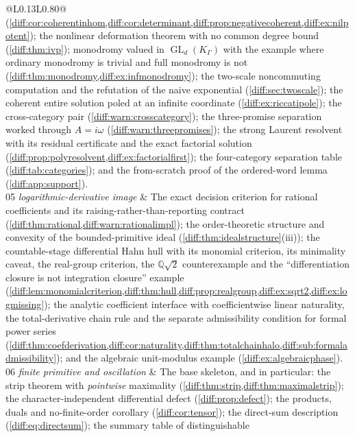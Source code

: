 \documentclass[11pt,letterpaper]{article}
\numberwithin{equation}{section}
\theoremstyle{definition}
\theoremstyle{remark}
\newcommand{\Q}{\mathbb Q}
\newcommand{\GL}{\operatorname{GL}}
\begin{document}
\begin{longtable}{@{}L{0.13\textwidth}L{0.80\textwidth}@{}}
(\cref{diff:cor:coherentinhom,diff:cor:determinant,diff:prop:negativecoherent,diff:ex:nilpotent});
the nonlinear deformation theorem with no common degree bound
(\cref{diff:thm:ivp}); monodromy valued in $\GL_{d}(K_{\Gamma})$ with the
example where ordinary monodromy is trivial and full monodromy is not
(\cref{diff:thm:monodromy,diff:ex:infmonodromy}); the two-scale noncommuting
computation and the refutation of the naive exponential
(\cref{diff:sec:twoscale}); the coherent entire solution poled at an infinite
coordinate (\cref{diff:ex:riccatipole}); the cross-category pair
(\cref{diff:warn:crosscategory}); the three-promise separation worked through
$A=i\omega$ (\cref{diff:warn:threepromises}); the strong Laurent resolvent
with its residual certificate and the exact factorial solution
(\cref{diff:prop:polyresolvent,diff:ex:factorialfirst}); the four-category
separation table (\cref{diff:tab:categories}); and the from-scratch proof of
the ordered-word lemma (\cref{diff:app:support}). \\[0.3em]
05 \newline\emph{logarithmic-derivative image} &
The exact decision criterion for rational coefficients and its raising-rather-than-reporting
contract (\cref{diff:thm:rational,diff:warn:rationalimpl}); the
order-theoretic structure and convexity of the bounded-primitive ideal
(\cref{diff:thm:idealstructure}(iii)); the countable-stage differential Hahn
hull with its monomial criterion, its minimality caveat, the real-group
criterion, the $\Q\sqrt2$ counterexample and the
``differentiation closure is not integration closure'' example
(\cref{diff:lem:monomialcriterion,diff:thm:hull,diff:prop:realgroup,diff:ex:sqrt2,diff:ex:logmissing});
the analytic coefficient interface with coefficientwise linear naturality,
the total-derivative chain rule and the separate admissibility condition for
formal power series
(\cref{diff:thm:coefderivation,diff:cor:naturality,diff:thm:totalchainhalo,diff:sub:formaladmissibility});
and the algebraic unit-modulus example
(\cref{diff:ex:algebraicphase}). \\[0.3em]
06 \newline\emph{finite primitive and oscillation} &
The base skeleton, and in particular: the strip theorem with
\emph{pointwise} maximality
(\cref{diff:thm:strip,diff:thm:maximalstrip}); the character-independent
differential defect (\cref{diff:prop:defect}); the products, duals and
no-finite-order corollary (\cref{diff:cor:tensor}); the direct-sum
description (\cref{diff:eq:directsum}); the summary table of distinguishable

\end{longtable}
\end{document}
